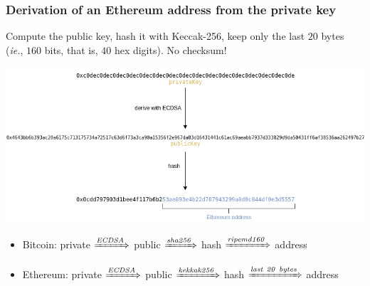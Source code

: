 \documentclass[11pt]{beamer}  %
\begin{document}
\begin{frame}\frametitle{Derivation of an Ethereum address from the private key}

  \begin{greenbox}{}
    Compute the public key,
    hash it with Keccak-256, keep only the last $20$ bytes (\emph{ie.}, $160$ bits, that is, $40$ hex digits). No checksum!
  \end{greenbox}
  
  \begin{center}
    \includegraphics[width=\textwidth,clip=false]{pictures/ethereum-address-derivation.png}
  \end{center}

  \begin{center}
    \begin{itemize}
    \item[] {\color{red}Bitcoin:} private $\xRightarrow{\mathit{ECDSA}}$ public
      $\xRightarrow{\mathit{sha256}}$
      hash $\xRightarrow{\mathit{ripemd160}}$ address
    \item[] {\color{red}Ethereum:} private $\xRightarrow{\mathit{ECDSA}}$ public
      $\xRightarrow{\mathit{kekkak256}}$
      hash $\xRightarrow{\mathit{last\ 20\ bytes}}$ address
    \end{itemize}
  \end{center}

\end{frame}
\end{document}
